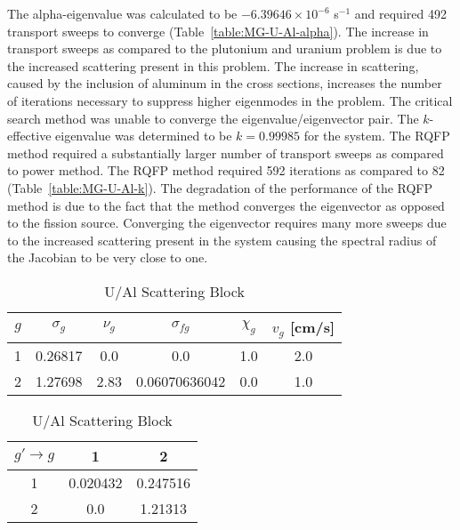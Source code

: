 The alpha-eigenvalue was calculated to be $-6.39646 \times 10^{-6}$ s$^{-1}$ and required 492 transport sweeps to converge (Table~\ref{table:MG-U-Al-alpha}). The increase in transport sweeps as compared to the plutonium and uranium problem is due to the increased scattering present in this problem. The increase in scattering, caused by the inclusion of aluminum in the cross sections, increases the number of iterations necessary to suppress higher eigenmodes in the problem. The critical search method was unable to converge the eigenvalue/eigenvector pair. The $k$-effective eigenvalue was determined to be $k=0.99985$ for the system. The RQFP method required a substantially larger number of transport sweeps as compared to power method. The RQFP method required 592 iterations as compared to 82 (Table~\ref{table:MG-U-Al-k}). The degradation of the performance of the RQFP method is due to the fact that the method converges the eigenvector as opposed to the fission source. Converging the eigenvector requires many more sweeps due to the increased scattering present in the system causing the spectral radius of the Jacobian to be very close to one. 

\begin{table}[!htbp]
	\caption{Sood Criticality Benchmark Problem 51 Cross Sections (cm$^{-1}$) in \cite{sood2003analytical}}
	\label{table:U-Al}
	\begin{subtable}[!htbp]{1.0\textwidth}
		\centering{}
		\begin{tabular}{@{}cccccc@{}}\toprule
			$g$ & $\sigma_{g} $ & $\nu_{g}$ & $\sigma_{fg}$ & $\chi_{g}$ & $v_{g}$ [cm/s] \\ 
        			\midrule
			1 & 0.26817 & 0.0 & 0.0 & 1.0 & 2.0 \\
			2 & 1.27698 & 2.83 & 0.06070636042 & 0.0 & 1.0 \\
			\bottomrule
		\end{tabular}
	\caption{U/Al Cross Sections}
	\label{table:TwoGroupU-Al}
	\end{subtable}%
	\vspace{0.25cm}
	\begin{subtable}[!htbp]{1.0\textwidth}
	\centering{}
	\begin{tabular}{@{}ccc@{}}\toprule
	$g' \rightarrow g$ & 1 & 2 \\ 
        \midrule
	1 & 0.020432 & 0.247516  \\
	2 & 0.0 & 1.21313 \\
	\bottomrule
	\end{tabular}
	\caption{U/Al Scattering Block}
	\label{table:TwoGroupU-Al_ScatterXS}
	\end{subtable}
\end{table}

